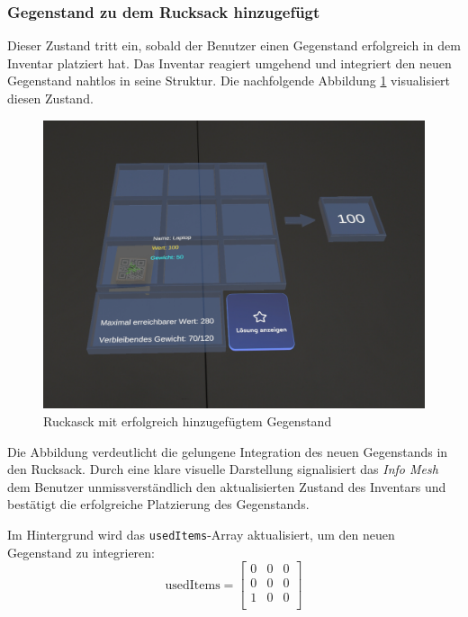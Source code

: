\subsubsection*{Gegenstand zu dem Rucksack hinzugefügt}
Dieser Zustand tritt ein, sobald der Benutzer einen Gegenstand erfolgreich in dem Inventar platziert hat. Das Inventar
reagiert umgehend und integriert den neuen Gegenstand nahtlos in seine Struktur. Die nachfolgende Abbildung
\ref{fig:controller_itemAdded} visualisiert diesen Zustand.

\begin{figure}[H]
    \centering
    \includegraphics[width=\textwidth]{images/itemAdded}
    \caption{Ruckasck mit erfolgreich hinzugefügtem Gegenstand}
    \label{fig:controller_itemAdded}
\end{figure}

Die Abbildung verdeutlicht die gelungene Integration des neuen Gegenstands in den Rucksack. Durch eine klare visuelle
Darstellung signalisiert das \textit{Info Mesh} dem Benutzer unmissverständlich den aktualisierten Zustand des Inventars
und bestätigt die erfolgreiche Platzierung des Gegenstands.

Im Hintergrund wird das \texttt{usedItems}-Array aktualisiert, um den neuen Gegenstand zu integrieren:
\[
\text{usedItems} =
\left[
\begin{array}{ccccc}
0 & 0 & 0 \\
0 & 0 & 0 \\
1 & 0 & 0 \\
\end{array}
\right]
\]

